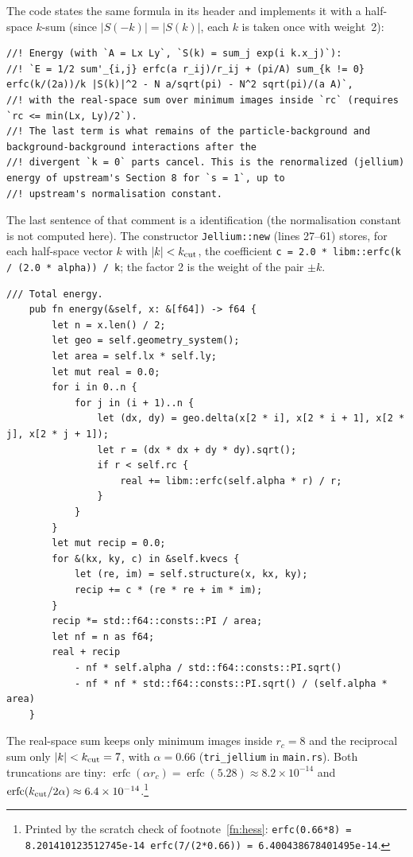 The code states the same formula in its header and implements it with a half-space $k$-sum (since $|S(-k)|=|S(k)|$,
each $k$ is taken once with weight~2):
\begin{lstlisting}[language={},title={jellium.rs, lines 4--9}]
//! Energy (with `A = Lx Ly`, `S(k) = sum_j exp(i k.x_j)`):
//! `E = 1/2 sum'_{i,j} erfc(a r_ij)/r_ij + (pi/A) sum_{k != 0} erfc(k/(2a))/k |S(k)|^2 - N a/sqrt(pi) - N^2 sqrt(pi)/(a A)`,
//! with the real-space sum over minimum images inside `rc` (requires `rc <= min(Lx, Ly)/2`).
//! The last term is what remains of the particle-background and background-background interactions after the
//! divergent `k = 0` parts cancel. This is the renormalized (jellium) energy of upstream's Section 8 for `s = 1`, up to
//! upstream's normalisation constant.
\end{lstlisting}
The last sentence of that comment is a \tierC{} identification (the normalisation constant is not computed here).
The constructor \texttt{Jellium::new} (lines 27--61) stores, for each half-space vector $k$ with $|k|<k_{\rm cut}$, the
coefficient \texttt{c = 2.0 * libm::erfc(k / (2.0 * alpha)) / k}; the factor 2 is the weight of the pair $\pm k$.
\begin{lstlisting}[language={},title={jellium.rs, lines 85--110}]
    /// Total energy.
    pub fn energy(&self, x: &[f64]) -> f64 {
        let n = x.len() / 2;
        let geo = self.geometry_system();
        let area = self.lx * self.ly;
        let mut real = 0.0;
        for i in 0..n {
            for j in (i + 1)..n {
                let (dx, dy) = geo.delta(x[2 * i], x[2 * i + 1], x[2 * j], x[2 * j + 1]);
                let r = (dx * dx + dy * dy).sqrt();
                if r < self.rc {
                    real += libm::erfc(self.alpha * r) / r;
                }
            }
        }
        let mut recip = 0.0;
        for &(kx, ky, c) in &self.kvecs {
            let (re, im) = self.structure(x, kx, ky);
            recip += c * (re * re + im * im);
        }
        recip *= std::f64::consts::PI / area;
        let nf = n as f64;
        real + recip
            - nf * self.alpha / std::f64::consts::PI.sqrt()
            - nf * nf * std::f64::consts::PI.sqrt() / (self.alpha * area)
    }
\end{lstlisting}
The real-space sum keeps only minimum images inside $r_c=8$ and the reciprocal sum only $|k|<k_{\rm cut}=7$, with
$\alpha=0.66$ (\texttt{tri\_jellium} in \texttt{main.rs}). Both truncations are tiny:
$\operatorname{erfc}(\alpha r_c)=\operatorname{erfc}(5.28)\approx8.2\times10^{-14}$ and
$\operatorname{erfc}(k_{\rm cut}/2\alpha)\approx6.4\times10^{-14}$.\footnote{Printed by the scratch check of
footnote~\ref{fn:hess}: \texttt{erfc(0.66*8) = 8.201410123512745e-14  erfc(7/(2*0.66)) = 6.400438678401495e-14}.}

